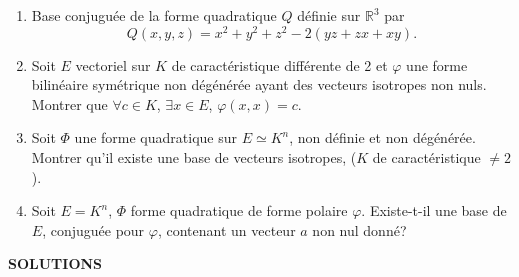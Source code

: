 \begin{enumerate}[label=\arabic*.,leftmargin=2.2em,itemsep=1.0em]
\item Base conjuguée de la forme quadratique $Q$ définie sur $\mathbb R^3$ par
\[
Q(x,y,z)=x^2+y^2+z^2-2(yz+zx+xy).
\]

\item Soit $E$ vectoriel sur $K$ de caractéristique différente de 2 et $\varphi$ une forme bilinéaire symétrique non dégénérée ayant des vecteurs isotropes non nuls. Montrer que $\forall c\in K$, $\exists x\in E$, $\varphi(x,x)=c$.

\item Soit $\Phi$ une forme quadratique sur $E\simeq K^n$, non définie et non dégénérée. Montrer qu'il existe une base de vecteurs isotropes, ($K$ de caractéristique $\ne2$).

\item Soit $E=K^n$, $\Phi$ forme quadratique de forme polaire $\varphi$. Existe-t-il une base de $E$, conjuguée pour $\varphi$, contenant un vecteur $a$ non nul donné?

\end{enumerate}

\clearpage
\begin{center}
{\Large\sffamily\bfseries\color{BellaLavenderDeep} SOLUTIONS}
\end{center}
\vspace{0.8em}

